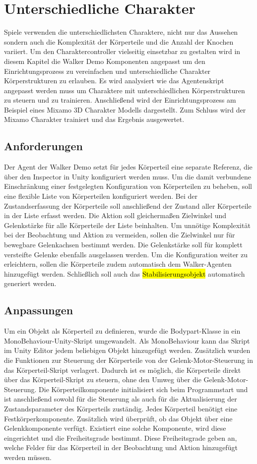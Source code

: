 \section{Unterschiedliche Charakter}
Spiele verwenden die unterschiedlichsten Charaktere, nicht nur das Aussehen sondern auch die Komplexität der Körperteile und die Anzahl der Knochen variiert. Um den Charaktercontroller vielseitig einsetzbar zu gestalten wird in diesem Kapitel die Walker Demo Komponenten angepasst um den Einrichtungsprozess zu vereinfachen und unterschiedliche Charakter Körperstrukturen zu erlauben. Es wird analysiert wie das Agentenskript angepasst werden muss um Charaktere mit unterschiedlichen Körperstrukturen zu steuern und zu trainieren. Anschließend wird der Einrichtungsprozess am Beispiel eines Mixamo 3D Charakter Modells dargestellt. Zum Schluss wird der Mixamo Charakter trainiert und das Ergebnis ausgewertet.

\subsection{Anforderungen}	
Der Agent der Walker Demo setzt für jedes Körperteil eine separate Referenz, die über den Inspector in Unity konfiguriert werden muss. Um die damit verbundene Einschränkung einer festgelegten Konfiguration von Körperteilen zu beheben, soll eine flexible Liste von Körperteilen konfiguriert werden. Bei der Zustandserfassung der Körperteile soll anschließend der Zustand aller Körperteile in der Liste erfasst werden. Die Aktion soll gleichermaßen Zielwinkel und Gelenkstärke für alle Körperteile der Liste beinhalten. Um unnötige Komplexität bei der Beobachtung und Aktion zu vermeiden, sollen die Zielwinkel nur für bewegbare Gelenkachsen bestimmt werden. Die Gelenkstärke soll für komplett versteifte Gelenke ebenfalls ausgelassen werden. Um die Konfiguration weiter zu erleichtern, sollen die Körperteile zudem automatisch dem Walker-Agenten hinzugefügt werden. Schließlich soll auch das \hl{Stabilisierungsobjekt} automatisch generiert werden.

\subsection{Anpassungen}
Um ein Objekt als Körperteil zu definieren, wurde die Bodypart-Klasse in ein MonoBehaviour-Unity-Skript umgewandelt. Als MonoBehaviour kann das Skript im Unity Editor jedem beliebigen Objekt hinzugefügt werden. Zusätzlich wurden die Funktionen zur Steuerung der Körperteile von der Gelenk-Motor-Steuerung in das Körperteil-Skript verlagert. Dadurch ist es möglich, die Körperteile direkt über das Körperteil-Skript zu steuern, ohne den Umweg über die Gelenk-Motor-Steuerung. Die Körperteilkomponente initialisiert sich beim Programmstart und ist anschließend sowohl für die Steuerung als auch für die Aktualisierung der Zustandsparameter des Körperteils zuständig. Jedes Körperteil benötigt eine Festkörperkomponente. Zusätzlich wird überprüft, ob das Objekt über eine Gelenkkomponente verfügt. Existiert eine solche Komponente, wird diese eingerichtet und die Freiheitsgrade bestimmt. Diese Freiheitsgrade geben an, welche Felder für das Körperteil in der Beobachtung und Aktion hinzugefügt werden müssen.

